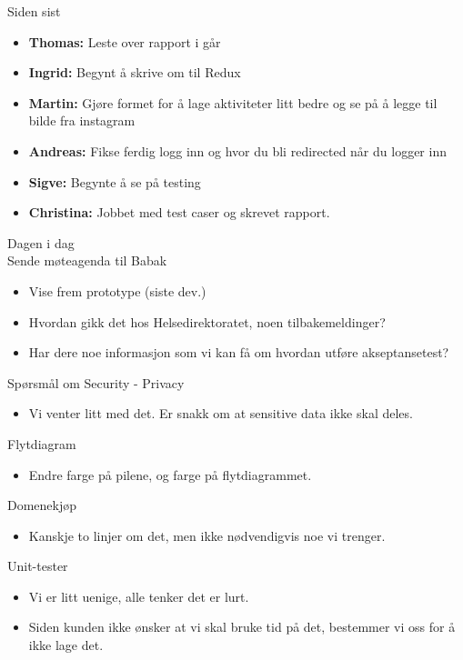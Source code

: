 {\Large{Siden sist}}
\begin{itemize}  
    \item \textbf{Thomas:} Leste over rapport i går
    \item \textbf{Ingrid:} Begynt å skrive om til Redux
    \item \textbf{Martin:} Gjøre formet for å lage aktiviteter litt bedre og se på å legge til bilde fra instagram
    \item \textbf{Andreas:} Fikse ferdig logg inn og hvor du bli redirected når du logger inn
    \item \textbf{Sigve:} Begynte å se på testing
    \item \textbf{Christina:} Jobbet med test caser og skrevet rapport.
\end{itemize}


{\Large{Dagen i dag}}\\
{\large{Sende møteagenda til Babak}}
\begin{itemize}  
    \item Vise frem prototype (siste dev.)
    \item Hvordan gikk det hos Helsedirektoratet, noen tilbakemeldinger?
    \item Har dere noe informasjon som vi kan få om hvordan utføre akseptansetest?
\end{itemize}

{\large{Spørsmål om Security - Privacy}}
\begin{itemize}  
    \item Vi venter litt med det. Er snakk om at sensitive data ikke skal deles.
\end{itemize}

{\large{Flytdiagram}}
\begin{itemize}  
    \item Endre farge på pilene, og farge på flytdiagrammet.
\end{itemize}

{\large{Domenekjøp}}
\begin{itemize}  
    \item Kanskje to linjer om det, men ikke nødvendigvis noe vi trenger.
\end{itemize}

{\large{Unit-tester}}
\begin{itemize}  
    \item Vi er litt uenige, alle tenker det er lurt.
    \item Siden kunden ikke ønsker at vi skal bruke tid på det, bestemmer vi oss for å ikke lage det.
\end{itemize}




